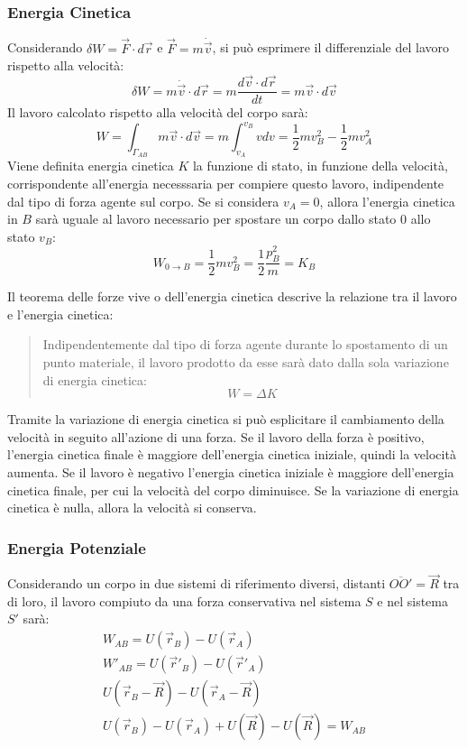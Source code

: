 \documentclass{article}
\numberwithin{equation}{subsection}
\begin{document}
\subsubsection{Energia Cinetica}
Considerando $\delta W=\vec{F}\cdot d\vec{r}$ e $\vec{F}=m\dot{\vec{v}}$, si può esprimere il differenziale del lavoro rispetto alla velocità:
\begin{equation*}
    \delta W=m\dot{\vec{v}}\cdot d\vec{r}=m\displaystyle\frac{d\vec{v}\cdot d\vec{r}}{dt}=m\vec{v}\cdot d\vec{v}
\end{equation*}
Il lavoro calcolato rispetto alla velocità del corpo sarà:
\begin{equation*}
    W=\int_{\Gamma_{AB}}m\vec{v}\cdot d\vec{v}=m\int_{v_A}^{v_B}vdv=\displaystyle\frac{1}{2}mv_B^2-\frac{1}{2}mv_A^2
\end{equation*}
Viene definita energia cinetica $K$ la funzione di stato, in funzione della velocità, corrispondente all'energia necesssaria per compiere questo 
lavoro, indipendente dal tipo di forza agente sul corpo. Se si 
considera $v_A=0$, allora l'energia cinetica in $B$ sarà uguale al 
lavoro necessario per spostare un corpo dallo stato $0$ allo stato $v_B$:
\begin{equation}
    W_{0\to B}=\displaystyle\frac{1}{2}mv_B^{2}=\frac{1}{2}\frac{p^2_B}{m}=K_B
\end{equation}


Il teorema delle forze vive o dell'energia cinetica descrive la relazione tra il lavoro e l'energia cinetica: 
\begin{quotation}
    Indipendentemente dal tipo di forza agente durante lo spostamento di un punto materiale, il lavoro
    prodotto da esse sarà dato dalla sola variazione di energia cinetica:
    \begin{equation}
        W=\Delta K
    \end{equation}
\end{quotation}  
Tramite la variazione di energia cinetica si può esplicitare il cambiamento della velocità in seguito all'azione di una forza. Se il lavoro della forza è positivo, l'energia 
cinetica finale è maggiore dell'energia cinetica iniziale, quindi la velocità aumenta. Se il lavoro è negativo l'energia cinetica iniziale è maggiore dell'energia cinetica 
finale, per cui la velocità del corpo diminuisce. Se la variazione di energia cinetica è nulla, allora la velocità si conserva. 

\subsubsection{Energia Potenziale}
Considerando un corpo in due sistemi di riferimento diversi, distanti 
$\overline{OO'}=\vec{R}$ tra di loro, il lavoro compiuto da una forza 
conservativa nel sistema $S$ e nel sistema $S'$ sarà:
\begin{gather*}
    W_{AB}=U(\vec{r}_B)-U(\vec{r}_A)\\
    W'_{AB}=U(\vec{r}'_B)-U(\vec{r}'_A)\\
    U(\vec{r}_B-\vec{R})-U(\vec{r}_A-\vec{R})\\
    U(\vec{r}_B)-U(\vec{r}_A)+U(\vec{R})-U(\vec{R})=W_{AB}
\end{gather*}
\end{document}
